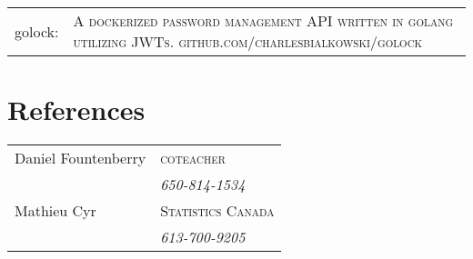 \documentclass[a4paper,10pt]{article}
\begin{document}
\begin{tabular}{p{2cm}p{11cm}}
	golock:&\textsc{A dockerized password management API written in golang utilizing JWTs. github.com/charlesbialkowski/golock}
\end{tabular}


\section{References}

\begin{tabular}{p{10cm}p{11cm}}
	Daniel Fountenberry&\textsc{coteacher} \\\textsc{}&\emph{650-814-1534}\\
	Mathieu Cyr&\textsc{Statistics Canada} \\\textsc{}&\emph{613-700-9205}\\
\end{tabular}
\end{document}
